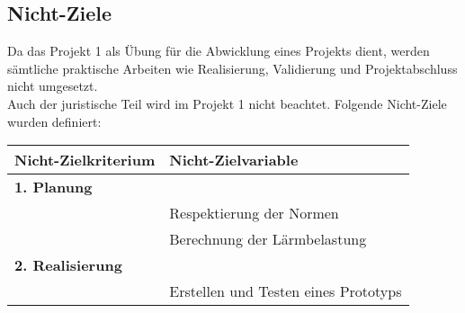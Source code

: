 \subsection{Nicht-Ziele}
Da das Projekt 1 als Übung für die Abwicklung eines Projekts dient, werden sämtliche praktische Arbeiten wie Realisierung, Validierung und Projektabschluss nicht umgesetzt.\\
Auch der juristische Teil wird im Projekt 1 nicht beachtet.
Folgende Nicht-Ziele wurden definiert:
\begin{table}[H]
\small
\begin{tabular}{ll}
\hline
\textbf{Nicht-Zielkriterium}				&\textbf{Nicht-Zielvariable}											\\
\hline
\rowcolor{hellgrau}
\textbf{1. Planung}						&																	\T\\
										&Respektierung der Normen											\\
										&Berechnung der Lärmbelastung										\B\\	
\rowcolor{hellgrau}
\textbf{2. Realisierung}					&																	\T\\
										&Erstellen und Testen eines Prototyps								\B\\
\hline
\end{tabular}
\end{table}
